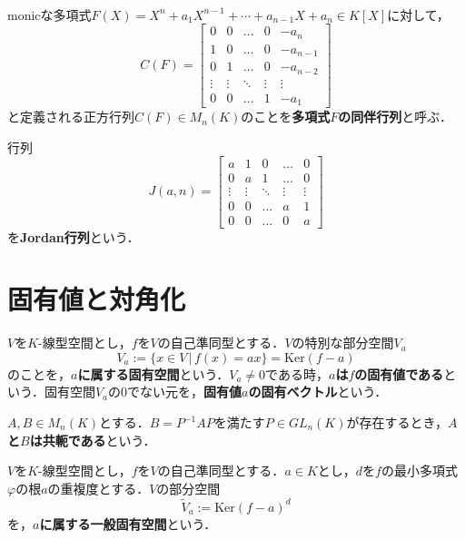 \documentclass[uplatex, 12pt, dvipdfmx]{jsreport}
\begin{document}
\begin{definition}　\\
    \rm{}monicな多項式$F(X) = X^n+a_1X^{n-1}+\cdots +a_{n-1}X+a_n \in K[X]$に対して，
        $$C(F)=\begin{bmatrix}
        0 & 0 & \dots & 0 & -a_n \\
        1 & 0 & \dots & 0 & -a_{n-1} \\
        0 & 1 & \dots & 0 & -a_{n-2} \\
        \vdots & \vdots & \ddots & \vdots & \vdots \\
        0 & 0 & \dots & 1 & -a_1
        \end{bmatrix}$$
    と定義される正方行列$C(F)\in M_n(K)$のことを\textbf{多項式$F$の同伴行列}と呼ぶ．
\end{definition}
\begin{definition}\rm{}
        行列$$J(a,n)=\begin{bmatrix}
        a & 1 & 0 & \dots & 0 \\
        0 & a & 1 & \dots & 0 \\
        \vdots & \vdots & \ddots & \vdots & \vdots \\
        0 & 0 & \dots & a & 1 \\
        0 & 0 & \dots & 0 & a
        \end{bmatrix}$$
    を\textbf{Jordan行列}という．
\end{definition}

\section{固有値と対角化}
\begin{definition}
    $V$を$K$-線型空間とし，$f$を$V$の自己準同型とする．$V$の特別な部分空間$V_a$
    $$V_a := \{ x\in V \,|\, f(x)=ax \} = \mathrm{Ker} (f-a)$$
    のことを，\textbf{$a$に属する固有空間}という．$V_a\ne 0$である時，\textbf{$a$は$f$の固有値である}という．固有空間$V_a$の$0$でない元を，\textbf{固有値$a$の固有ベクトル}という．
\end{definition}

\begin{definition}[conjugate]
    $A,B\in M_n(K)$とする．$B=P^{-1}AP$を満たす$P\in GL_n(K)$が存在するとき，\textbf{$A$と$B$は共軛である}という．
\end{definition}

\begin{definition}
    $V$を$K$-線型空間とし，$f$を$V$の自己準同型とする．$a\in K$とし，$d$を$f$の最小多項式$\varphi$の根$a$の重複度とする．$V$の部分空間
    $$\widetilde{V}_a:=\mathrm{Ker}(f-a)^d$$
    を，\textbf{$a$に属する一般固有空間}という．
\end{definition}
\end{document}
